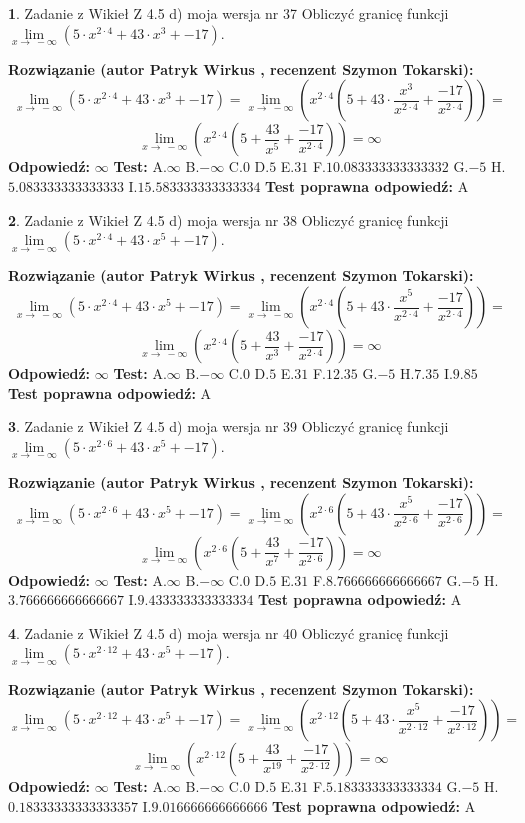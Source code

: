 \documentclass[12pt, a4paper]{article}
\theoremstyle{definition} %
\newtheorem{zad}{}
\newcommand{\zadStart}[1]{\begin{zad}#1\newline}
\newcommand{\zadStop}{\end{zad}}
\newcommand{\rozwStart}[2]{\noindent \textbf{Rozwiązanie (autor #1 , recenzent #2): }\newline}
\newcommand{\rozwStop}{\newline}
\newcommand{\odpStart}{\noindent \textbf{Odpowiedź:}\newline}
\newcommand{\odpStop}{\newline}
\newcommand{\testStart}{\noindent \textbf{Test:}\newline}
\newcommand{\testStop}{\newline}
\newcommand{\kluczStart}{\noindent \textbf{Test poprawna odpowiedź:}\newline}
\newcommand{\kluczStop}{\newline}
\begin{document}
\zadStart{Zadanie z Wikieł Z 4.5 d) moja wersja nr 37}
Obliczyć granicę funkcji  $\lim\limits_{x\to\ -\infty}(5 \cdot x^{2\cdot4}+43 \cdot x^{3}+-17)$.
\zadStop
\rozwStart{Patryk Wirkus}{Szymon Tokarski}
$$\lim\limits_{x\to\ -\infty}(5 \cdot x^{2\cdot4}+43 \cdot x^{3}+-17) = \lim\limits_{x\to\ -\infty}(x^{2\cdot4}(5 +43 \cdot \frac{x^{3}}{x^{2\cdot4}}+\frac{-17}{x^{2\cdot4}})) =$$ $$\lim\limits_{x\to\ -\infty}(x^{2\cdot4}(5 +\frac{43}{x^{5}}+\frac{-17}{x^{2\cdot4}})) =\infty$$
\rozwStop
\odpStart
$\infty$
\odpStop
\testStart
A.$\infty$ B.$-\infty$ C.$0$ D.$5$ E.$31$
F.$10.083333333333332$ G.$-5$
H.$5.083333333333333$
I.$15.583333333333334$
\testStop
\kluczStart
A
\kluczStop



\zadStart{Zadanie z Wikieł Z 4.5 d) moja wersja nr 38}
Obliczyć granicę funkcji  $\lim\limits_{x\to\ -\infty}(5 \cdot x^{2\cdot4}+43 \cdot x^{5}+-17)$.
\zadStop
\rozwStart{Patryk Wirkus}{Szymon Tokarski}
$$\lim\limits_{x\to\ -\infty}(5 \cdot x^{2\cdot4}+43 \cdot x^{5}+-17) = \lim\limits_{x\to\ -\infty}(x^{2\cdot4}(5 +43 \cdot \frac{x^{5}}{x^{2\cdot4}}+\frac{-17}{x^{2\cdot4}})) =$$ $$\lim\limits_{x\to\ -\infty}(x^{2\cdot4}(5 +\frac{43}{x^{3}}+\frac{-17}{x^{2\cdot4}})) =\infty$$
\rozwStop
\odpStart
$\infty$
\odpStop
\testStart
A.$\infty$ B.$-\infty$ C.$0$ D.$5$ E.$31$
F.$12.35$ G.$-5$
H.$7.35$
I.$9.85$
\testStop
\kluczStart
A
\kluczStop



\zadStart{Zadanie z Wikieł Z 4.5 d) moja wersja nr 39}
Obliczyć granicę funkcji  $\lim\limits_{x\to\ -\infty}(5 \cdot x^{2\cdot6}+43 \cdot x^{5}+-17)$.
\zadStop
\rozwStart{Patryk Wirkus}{Szymon Tokarski}
$$\lim\limits_{x\to\ -\infty}(5 \cdot x^{2\cdot6}+43 \cdot x^{5}+-17) = \lim\limits_{x\to\ -\infty}(x^{2\cdot6}(5 +43 \cdot \frac{x^{5}}{x^{2\cdot6}}+\frac{-17}{x^{2\cdot6}})) =$$ $$\lim\limits_{x\to\ -\infty}(x^{2\cdot6}(5 +\frac{43}{x^{7}}+\frac{-17}{x^{2\cdot6}})) =\infty$$
\rozwStop
\odpStart
$\infty$
\odpStop
\testStart
A.$\infty$ B.$-\infty$ C.$0$ D.$5$ E.$31$
F.$8.766666666666667$ G.$-5$
H.$3.766666666666667$
I.$9.433333333333334$
\testStop
\kluczStart
A
\kluczStop



\zadStart{Zadanie z Wikieł Z 4.5 d) moja wersja nr 40}
Obliczyć granicę funkcji  $\lim\limits_{x\to\ -\infty}(5 \cdot x^{2\cdot12}+43 \cdot x^{5}+-17)$.
\zadStop
\rozwStart{Patryk Wirkus}{Szymon Tokarski}
$$\lim\limits_{x\to\ -\infty}(5 \cdot x^{2\cdot12}+43 \cdot x^{5}+-17) = \lim\limits_{x\to\ -\infty}(x^{2\cdot12}(5 +43 \cdot \frac{x^{5}}{x^{2\cdot12}}+\frac{-17}{x^{2\cdot12}})) =$$ $$\lim\limits_{x\to\ -\infty}(x^{2\cdot12}(5 +\frac{43}{x^{19}}+\frac{-17}{x^{2\cdot12}})) =\infty$$
\rozwStop
\odpStart
$\infty$
\odpStop
\testStart
A.$\infty$ B.$-\infty$ C.$0$ D.$5$ E.$31$
F.$5.183333333333334$ G.$-5$
H.$0.18333333333333357$
I.$9.016666666666666$
\testStop
\kluczStart
A
\kluczStop
\end{document}
